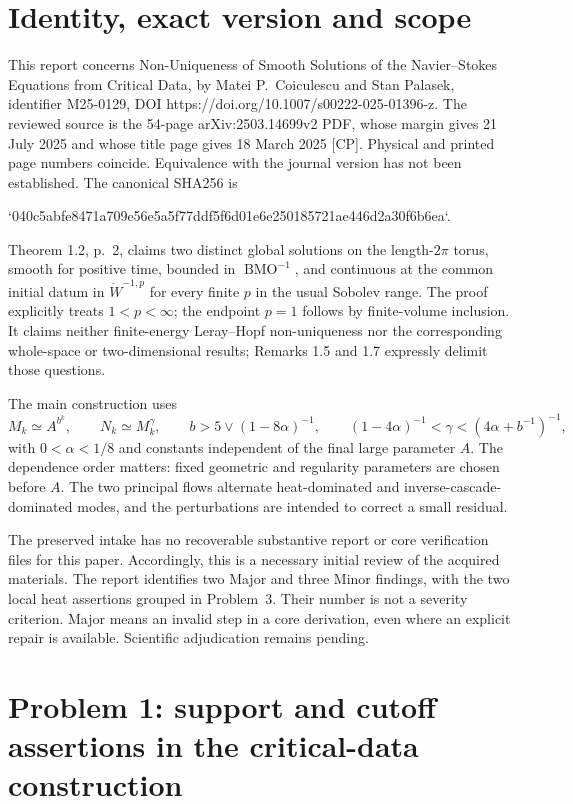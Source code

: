 \documentclass[10pt]{article}
\begin{document}
\section*{Identity, exact version and scope}
This report concerns Non-Uniqueness of Smooth Solutions of the Navier–Stokes Equations from Critical Data, by Matei P. Coiculescu and Stan Palasek, identifier M25-0129, DOI https://doi.org/10.1007/s00222-025-01396-z. The reviewed source is the 54-page arXiv:2503.14699v2 PDF, whose margin gives 21 July 2025 and whose title page gives 18 March 2025 [CP]. Physical and printed page numbers coincide. Equivalence with the journal version has not been established. The canonical SHA256 is\par
`040c5abfe8471a709e56e5a5f77ddf5f6d01e6e250185721ae446d2a30f6b6ea`.\par
Theorem 1.2, p. 2, claims two distinct global solutions on the length-\(2\pi\) torus, smooth for positive time, bounded in \(\operatorname{BMO}^{-1}\), and continuous at the common initial datum in \(\dot W^{-1,p}\) for every finite \(p\) in the usual Sobolev range. The proof explicitly treats \(1<p<\infty\); the endpoint \(p=1\) follows by finite-volume inclusion. It claims neither finite-energy Leray–Hopf non-uniqueness nor the corresponding whole-space or two-dimensional results; Remarks 1.5 and 1.7 expressly delimit those questions.\par
The main construction uses \[M_k\simeq A^{b^k},\qquad N_k\simeq M_k^\gamma,\qquad
 b>5\vee(1-8\alpha)^{-1},\qquad
 (1-4\alpha)^{-1}<\gamma<(4\alpha+b^{-1})^{-1},\] with \(0<\alpha<1/8\) and constants independent of the final large parameter \(A\). The dependence order matters: fixed geometric and regularity parameters are chosen before \(A\). The two principal flows alternate heat-dominated and inverse-cascade-dominated modes, and the perturbations are intended to correct a small residual.\par
The preserved intake has no recoverable substantive report or core verification files for this paper. Accordingly, this is a necessary initial review of the acquired materials. The report identifies two Major and three Minor findings, with the two local heat assertions grouped in Problem 3. Their number is not a severity criterion. Major means an invalid step in a core derivation, even where an explicit repair is available. Scientific adjudication remains pending.\par
\section*{Problem 1: support and cutoff assertions in the critical-data construction}
\end{document}
